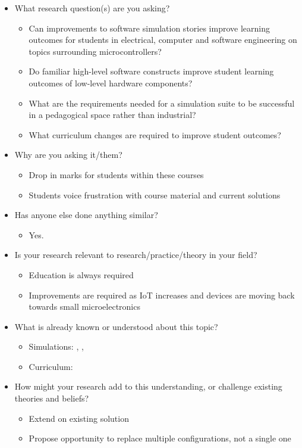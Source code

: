 \begin{itemize}

\item What research question(s) are you asking?
\begin{itemize}
\item Can improvements to software simulation stories improve learning outcomes for students in electrical, computer and software engineering on topics surrounding microcontrollers? 
\item Do familiar high-level software constructs improve student learning outcomes of low-level hardware components?
\item What are the requirements needed for a simulation suite to be successful in a pedagogical space rather than industrial?
\item What curriculum changes are required to improve student outcomes?
\end{itemize}

\item Why are you asking it/them?
\begin{itemize}
\item Drop in marks for students within these courses
\item Students voice frustration with course material and current solutions
\end{itemize}

\item Has anyone else done anything similar?
\begin{itemize}
\item Yes. 
\end{itemize}
\item Is your research relevant to research/practice/theory in your field?
\begin{itemize}
\item Education is always required
\item Improvements are required as IoT increases and devices are moving back towards small
	microelectronics
\end{itemize}
\item What is already known or understood about this topic?
\begin{itemize}
\item Simulations: \cite{Tappan2009}, \cite{Skrien2001}, \cite{Skillen2011}
\item Curriculum: 
\end{itemize}
\item How might your research add to this understanding, or challenge existing theories and beliefs?
\begin{itemize}
\item Extend on existing solution
\item Propose opportunity to replace multiple configurations, not a single one
\end{itemize}
\end{itemize}

